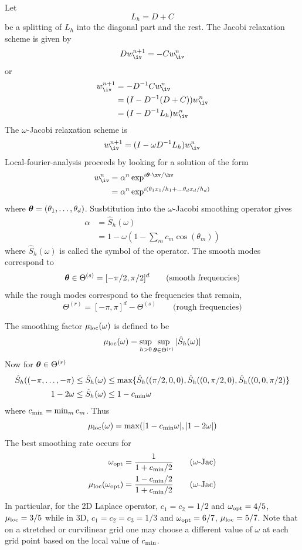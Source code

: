 \documentclass{article}
\begin{document}
Let
\[ 
    L_h = D + C
\]
be a splitting of $L_h$ into the diagonal part and the rest.
The Jacobi relaxation scheme is given by 
\[
   D w_{\iv}^{n+1} = -C w_{\iv}^{n}
\]
or
\begin{align*}
    w_{\iv}^{n+1} & = - D^{-1}C w_{\iv}^{n} \\
                  &= (I - D^{-1}( D+C ) )w_{\iv}^{n} \\
                  &= (I - D^{-1}L_h )w_{\iv}^{n}
\end{align*}
The $\omega$-Jacobi relaxation scheme is
\[
   w_{\iv}^{n+1} =  (I - \omega D^{-1} L_h ) w_{\iv}^{n}
\]
Local-fourier-analysis  proceeds by 
looking for a solution of the form
\begin{align*}
   w_{\iv}^{n} &= \alpha^n \exp^{ i \thetav\cdot\xv/\hv }  \\
               &= \alpha^n \exp^{ i (\theta_1 x_1/h_1 + \ldots \theta_d x_d/h_d) }
\end{align*}
where $\boldsymbol{\theta}=(\theta_1,\ldots,\theta_d)$. Susbtitution into the $\omega$-Jacobi smoothing
operator  gives 
\begin{align*}
    \alpha &= \hat{S}_h(\omega)  \\
           &= 1 - \omega ( 1 - \sum_m c_m \cos(\theta_m) )
\end{align*}
where $\hat{S}_h(\omega)$ is called the symbol of the operator.
The smooth modes correspond to 
\[
 \boldsymbol{\theta}\in \Theta^{(s)} = [-\pi/2,\pi/2]^d \qquad\mbox{(smooth frequencies)}
\]
while the rough modes correspond to the frequencies that remain,
\[
\Theta^{(r)} = [-\pi,\pi]^d - \Theta^{(s)} \qquad\mbox{(rough frequencies)}
\]

\newcommand{\cmin}{c_{\rm min}}
\newcommand{\cmax}{C_{\rm max}}

The smoothing factor $\mu_{\rm loc}(\omega)$ is defined to be
\[
   \mu_{\rm loc} (\omega) = \sup_{h>0} \sup_{\boldsymbol{\theta}\in \Theta^{(r)}} \vert  \hat{S}_h(\omega)  \vert
\]
Now for $\boldsymbol{\theta}\in \Theta^{(r)}$
\begin{align*}
     \hat{S}_h((-\pi,\ldots,-\pi) &\le \hat{S}_h(\omega) \le
            \max \{ \hat{S}_h((\pi/2,0,0),\hat{S}_h((0,\pi/2,0), \hat{S}_h((0,0,\pi/2) \} \\
      1-2\omega &\le \hat{S}_h(\omega) \le 1 - \cmin \omega 
\end{align*}
where $\cmin = \min_m c_m$.
Thus
\[
    \mu_{\rm loc}(\omega) =  \max( \vert 1 - \cmin\omega \vert, \vert 1 - 2\omega \vert )
\]
The best smoothing rate occurs for 
\begin{align*}
  \omega_{\rm opt} &= {1\over 1+ \cmin/2} \qquad\mbox{($\omega$-Jac)}\\
 \mu_{\rm loc}(\omega_{\rm opt}) &= {1 - \cmin/2 \over 1+ \cmin/2 } \qquad\mbox{($\omega$-Jac)}
\end{align*}
In particular, for the 2D Laplace operator, $c_1=c_2=1/2$ and $\omega_{\rm opt}=4/5$, $\mu_{\rm loc}=3/5$
while in 3D, $c_1=c_2=c_3=1/3$ and $\omega_{\rm opt}=6/7$, $\mu_{\rm loc}=5/7$.
Note that on a stretched or curvilinear grid one may choose a different value of $\omega$ at each grid point based
on the local value of $\cmin$.
\end{document}
